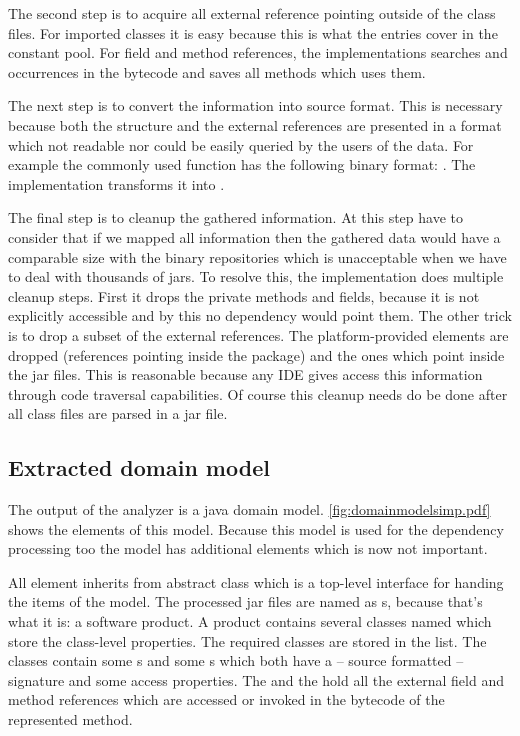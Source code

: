 The second step is to acquire all external reference pointing outside of the
class files. For imported classes it is easy because this is what the
 entries cover in the constant pool. For field and method
references, the implementations searches  and
 occurrences in the bytecode and saves all methods 
which uses them.

The next step is to convert the information into source format. This is
necessary because both the structure and the external references are presented
in a format which not readable nor could be easily queried by the users of the
data. For example the commonly used  function has the
following binary format: . The implementation
transforms it into .

The final step is to cleanup the gathered information. At this step have to
consider that if we mapped all information then the gathered data would have a
comparable size with the binary repositories which is unacceptable when we have
to deal with thousands of jars. To resolve this, the implementation does
multiple cleanup steps. First it drops the private methods and fields, because
it is not explicitly accessible and by this no dependency would point them. The
other trick is to drop a subset of the external references. The
platform-provided elements are dropped (references pointing inside the
 package) and the ones which point inside the jar files. This is
reasonable because any IDE gives access this information through code traversal
capabilities. Of course this cleanup needs do be done after all class files are 
parsed in a jar file. 


\subsection{Extracted domain model}
The output of the analyzer is a java domain model.
\autoref{fig:domainmodelsimp.pdf} shows the elements of this model. Because this model
is used for the dependency processing too the model has additional elements which is 
now not important. 

All element inherits from abstract  class which is a top-level
interface for handing the items of the model. The processed jar files are named
as s, because that's what it is: a software product. A product
contains several classes named  which store the class-level
properties. The required classes are stored in the 
list. The classes contain some s and some s which both have 
a -- source formatted -- signature and some access properties. The 
and the  hold all the external field and method references which are
accessed or invoked in the bytecode of the represented method. 

